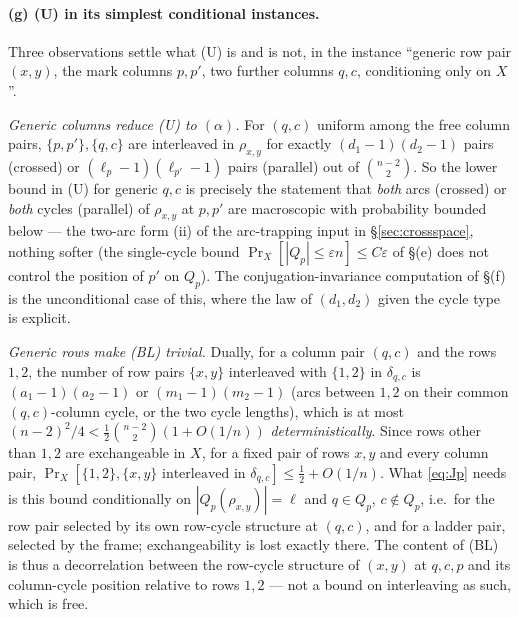 \paragraph{(g) (U) in its simplest conditional instances.}  Three
observations settle what (U) is and is not, in the instance ``generic
row pair $(x,y)$, the mark columns $p,p'$, two further columns $q,c$,
conditioning only on $X$''.

\emph{Generic columns reduce (U) to $(\alpha)$.}  For $(q,c)$ uniform
among the free column pairs, $\{p,p'\},\{q,c\}$ are interleaved in
$\rho_{x,y}$ for exactly $(d_1-1)(d_2-1)$ pairs (crossed) or
$(\ell_p-1)(\ell_{p'}-1)$ pairs (parallel) out of $\binom{n-2}2$.  So
the lower bound in (U) for generic $q,c$ is precisely the statement
that \emph{both} arcs (crossed) or \emph{both} cycles (parallel) of
$\rho_{x,y}$ at $p,p'$ are macroscopic with probability bounded below
--- the two-arc form (ii) of the arc-trapping input in
\S\ref{sec:crossspace}, nothing softer (the single-cycle bound
$\Pr_X[|Q_p|\le\varepsilon n]\le C\varepsilon$ of \S(e) does not
control the position of $p'$ on $Q_p$).  The conjugation-invariance computation of \S(f) is
the unconditional case of this, where the law of $(d_1,d_2)$ given the
cycle type is explicit.

\emph{Generic rows make (BL) trivial.}  Dually, for a column pair
$(q,c)$ and the rows $1,2$, the number of row pairs $\{x,y\}$ interleaved
with $\{1,2\}$ in $\delta_{q,c}$ is $(a_1-1)(a_2-1)$ or $(m_1-1)(m_2-1)$
(arcs between $1,2$ on their common $(q,c)$-column cycle, or the two
cycle lengths), which is at most $(n-2)^2/4<\tfrac12\binom{n-2}2(1+O(1/n))$
\emph{deterministically}.  Since rows other than $1,2$ are exchangeable
in $X$, for a fixed pair of rows $x,y$ and every column pair,
$\Pr_X[\{1,2\},\{x,y\}\text{ interleaved in }\delta_{q,c}]\le\tfrac12+O(1/n)$.
What \eqref{eq:Jp} needs is this bound conditionally on
$|Q_p(\rho_{x,y})|=\ell$ and $q\in Q_p$, $c\notin Q_p$, i.e.\ for the
row pair selected by its own row-cycle structure at $(q,c)$, and for
a ladder pair, selected by the frame; exchangeability is lost exactly
there.  The content of (BL) is thus a decorrelation between the
row-cycle structure of $(x,y)$ at $q,c,p$ and its column-cycle
position relative to rows $1,2$ --- not a bound on interleaving as
such, which is free.


